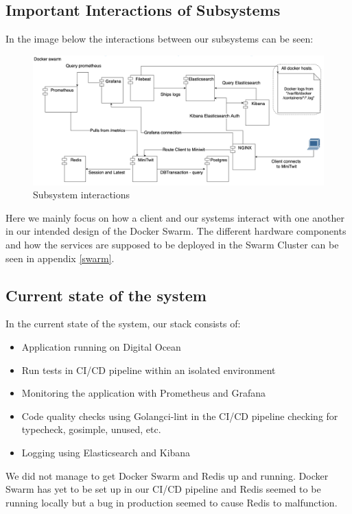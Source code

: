 \subsection{Important Interactions of Subsystems}
In the image below the interactions between our subsystems can be seen:

\begin{figure}[H]
    \centering
    \captionsetup{justification=centering,margin=1cm}
    \includegraphics[width=\linewidth]{report/images/InteractionsOfSystems.png}
    \caption{Subsystem interactions}
    \label{fig:minitwit}
\end{figure}

Here we mainly focus on how a client and our systems interact with one another in our intended design of the Docker Swarm. The different hardware components and how the services are supposed to be deployed in the Swarm Cluster can be seen in appendix \ref{swarm}.

\subsection{Current state of the system}
In the current state of the system, our stack consists of: 
\begin{itemize}
    \item Application running on Digital Ocean
    \item Run tests in CI/CD pipeline within an isolated environment
    \item Monitoring the application with Prometheus and Grafana
    \item Code quality checks using Golangci-lint in the CI/CD pipeline checking for typecheck, gosimple, unused, etc.
    \item Logging using Elasticsearch and Kibana
\end{itemize}
We did not manage to get Docker Swarm and Redis up and running. Docker Swarm has yet to be set up in our CI/CD pipeline and Redis seemed to be running locally but a bug in production seemed to cause Redis to malfunction.

